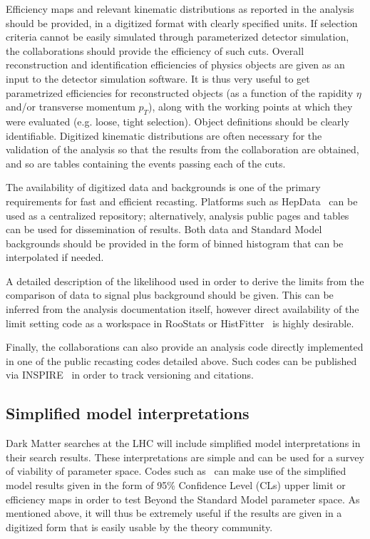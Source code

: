 Efficiency maps and relevant kinematic distributions as reported in the analysis should be provided, in a digitized format with clearly specified units.
If selection criteria cannot be easily simulated through parameterized detector simulation, the collaborations should provide the efficiency of such cuts. 
Overall reconstruction and identification efficiencies of physics objects are given as an input to the detector simulation software. 
It is thus very useful to get parametrized efficiencies for reconstructed objects (as a function of the rapidity $\eta$ and/or transverse momentum $p_T$), 
along with the working points at which they were evaluated (e.g. loose, tight selection). Object definitions should be clearly identifiable. 
Digitized kinematic distributions are often necessary for the validation of the analysis so that the results from the collaboration are obtained, 
and so are tables containing the events passing each of the cuts. 

The availability of digitized data and backgrounds is one of the primary requirements for fast and efficient recasting. 
Platforms such as HepData~\cite{HEPData_doc} can be used as a centralized repository; alternatively, analysis public pages and tables can be used
for dissemination of results. Both data and Standard Model backgrounds should be provided in the form of binned histogram that can be interpolated if needed. 

A detailed description of the likelihood used in order to derive the limits from the comparison of data to signal plus background should be given. 
This can be inferred from the analysis documentation itself, however direct availability of the limit setting code as a workspace in RooStats or HistFitter~\cite{Baak:2014wma} is highly desirable. 

Finally, the collaborations can also provide an analysis code directly implemented in one of the public recasting codes detailed above. 
Such codes can be published via INSPIRE~\cite{INSPIRE} in order to track versioning and citations. 

\subsection{Simplified model interpretations}

Dark Matter searches at the LHC will include simplified model interpretations in their search results. These interpretations are simple and can be used for a survey of viability of parameter space. Codes such as~\cite{Kraml:2013mwa, Kraml:2014sna, Papucci:2014rja} can make use of the simplified model results given in the form of 95\% Confidence Level (CLs) upper limit  or efficiency maps in order to test Beyond the Standard Model parameter space. As mentioned above, it will thus be extremely useful if the results are given in a digitized form that is easily usable by the theory community. 

